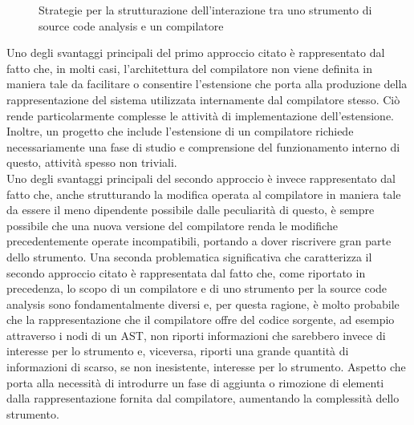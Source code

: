 \begin{figure}
\caption{Strategie per la strutturazione dell'interazione tra uno strumento di
source code analysis e un compilatore}
\label{fig:sca-compiler-strategies}
\end{figure}

Uno degli svantaggi principali del primo approccio citato è rappresentato dal
fatto che, in molti casi, l'architettura del compilatore non viene definita in
maniera tale da facilitare o consentire l'estensione che porta alla produzione
della rappresentazione del sistema utilizzata internamente dal compilatore
stesso. Ciò rende particolarmente complesse le attività di implementazione
dell'estensione. Inoltre, un progetto che include l'estensione di un compilatore
richiede necessariamente una fase di studio e comprensione del funzionamento
interno di questo, attività spesso non triviali.\\

Uno degli svantaggi principali del secondo approccio è invece rappresentato dal
fatto che, anche strutturando la modifica operata al compilatore in maniera tale
da essere il meno dipendente possibile dalle peculiarità di questo, è sempre
possibile che una nuova versione del compilatore renda le modifiche
precedentemente operate incompatibili, portando a dover riscrivere gran parte
dello strumento. Una seconda problematica significativa che caratterizza il
secondo approccio citato è rappresentata dal fatto che, come riportato in
precedenza, lo scopo di un compilatore e di uno strumento per la source code
analysis sono fondamentalmente diversi e, per questa ragione, è molto probabile
che la rappresentazione che il compilatore offre del codice sorgente, ad esempio
attraverso i nodi di un AST, non riporti informazioni che sarebbero invece di
interesse per lo strumento e, viceversa, riporti una grande quantità di
informazioni di scarso, se non inesistente, interesse per lo strumento. Aspetto
che porta alla necessità di introdurre un fase di aggiunta o rimozione di
elementi dalla rappresentazione fornita dal compilatore, aumentando la
complessità dello strumento.\\

